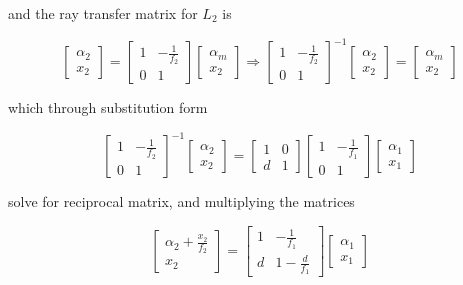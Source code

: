 \documentclass[main.tex]{subfiles}
\begin{document}
and the ray transfer matrix for $L_2$ is

\begin{equation}
\begin{bmatrix}
    \alpha_2 \\
    x_2
\end{bmatrix}
=
\begin{bmatrix}
    1   & -\frac{1}{f_2} \\
    0   &   1
\end{bmatrix}
\begin{bmatrix}
    \alpha_{m}  \\
    x_2
\end{bmatrix}
\Rightarrow
\begin{bmatrix}
    1   & -\frac{1}{f_2} \\
    0   &   1
\end{bmatrix}^{-1}
\begin{bmatrix}
    \alpha_2 \\
    x_2
\end{bmatrix}
=
\begin{bmatrix}
    \alpha_{m}  \\
    x_2
\end{bmatrix}
\end{equation}

which through substitution form

\begin{equation}
\begin{bmatrix}
    1   & -\frac{1}{f_2} \\
    0   &   1
\end{bmatrix}^{-1}
\begin{bmatrix}
    \alpha_2 \\
    x_2
\end{bmatrix}
=
\begin{bmatrix}
    1   &   0 \\
    d   &   1
\end{bmatrix}
\begin{bmatrix}
    1   & -\frac{1}{f_1} \\
    0   &   1
\end{bmatrix}
\begin{bmatrix}
     \alpha_{1} \\
    x_1
\end{bmatrix}
\end{equation}

solve for reciprocal matrix, and multiplying the matrices 

\begin{equation}
\begin{bmatrix}
    \alpha_2 + \frac{x_2}{f_2}\\
    x_2
\end{bmatrix}
=
\begin{bmatrix}
    1   & -\frac{1}{f_1} \\
    d   & 1 -\frac{d}{f_1}  
\end{bmatrix}
\begin{bmatrix}
    \alpha_{1} \\
    x_1
\end{bmatrix}
\end{equation}
\end{document}
